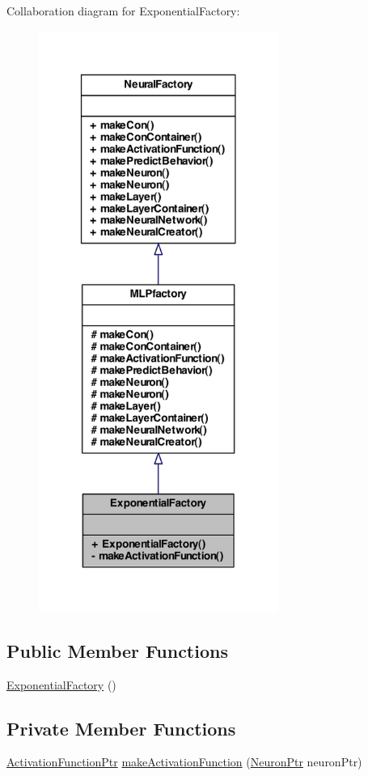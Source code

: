 Collaboration diagram for ExponentialFactory:
\nopagebreak
\begin{figure}[H]
\begin{center}
\leavevmode
\includegraphics[width=222pt]{class_exponential_factory__coll__graph}
\end{center}
\end{figure}
\subsection*{Public Member Functions}
\begin{DoxyCompactItemize}
\item 
\hyperlink{class_exponential_factory_afc852bdfae4ce077bcbfb2cb78e9c199}{ExponentialFactory} ()
\end{DoxyCompactItemize}
\subsection*{Private Member Functions}
\begin{DoxyCompactItemize}
\item 
\hyperlink{_a_m_o_r_e_8h_a77602a0277a02e5769c3df0adc669b17}{ActivationFunctionPtr} \hyperlink{class_exponential_factory_a68819f57ee476e87a2aa23827fc52578}{makeActivationFunction} (\hyperlink{_a_m_o_r_e_8h_ac1ea936c2c7728eb382278131652fef4}{NeuronPtr} neuronPtr)
\end{DoxyCompactItemize}


